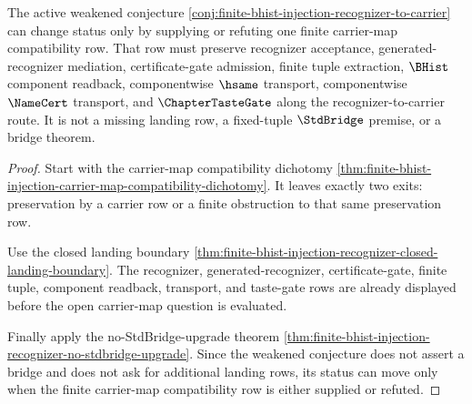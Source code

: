 \begin{theorem}
\label{thm:finite-bhist-injection-carrier-map-compatibility-row}
The active weakened conjecture \autoref{conj:finite-bhist-injection-recognizer-to-carrier} can change status only by supplying or refuting one finite carrier-map compatibility row. That row must preserve recognizer acceptance, generated-recognizer mediation, certificate-gate admission, finite tuple extraction, $\BHist$ component readback, componentwise $\hsame$ transport, componentwise $\NameCert$ transport, and $\ChapterTasteGate$ along the recognizer-to-carrier route. It is not a missing landing row, a fixed-tuple $\StdBridge$ premise, or a bridge theorem.
\end{theorem}
\begin{proof}
Start with the carrier-map compatibility dichotomy \autoref{thm:finite-bhist-injection-carrier-map-compatibility-dichotomy}. It leaves exactly two exits: preservation by a carrier row or a finite obstruction to that same preservation row.

Use the closed landing boundary \autoref{thm:finite-bhist-injection-recognizer-closed-landing-boundary}. The recognizer, generated-recognizer, certificate-gate, finite tuple, component readback, transport, and taste-gate rows are already displayed before the open carrier-map question is evaluated.

Finally apply the no-StdBridge-upgrade theorem \autoref{thm:finite-bhist-injection-recognizer-no-stdbridge-upgrade}. Since the weakened conjecture does not assert a bridge and does not ask for additional landing rows, its status can move only when the finite carrier-map compatibility row is either supplied or refuted.
\end{proof}

